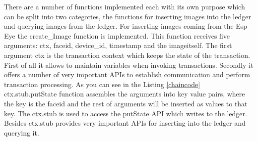 There are a number of functions implemented each with its own purpose which can be split into two categories, the functions for inserting images into the ledger and querying images from the ledger.  For inserting images coming from the Esp Eye the {\selectfont create\_Image} function is implemented. This function receives five arguments: {\selectfont ctx}, {\selectfont faceid}, {\selectfont device\_id}, {\selectfont timestamp} and the {\selectfont imageitself}.
The first argument {\selectfont ctx} is the transaction context which keeps the state of the transaction. First of all it allows to maintain variables when invoking transactions. Secondly it offers a number of very important APIs to establish communication and perform transaction processing. As you can see in the Listing \ref{chaincode} {\selectfont ctx.stub.putState} function assembles the arguments into key value pairs, where the key is the {\selectfont faceid} and the rest of arguments will be inserted as values to that key. The {\selectfont ctx.stub} is used to access the 
{\selectfont putState} API which writes to the ledger. Besides {\selectfont ctx.stub} provides very important APIs for inserting into the ledger and querying it.  










